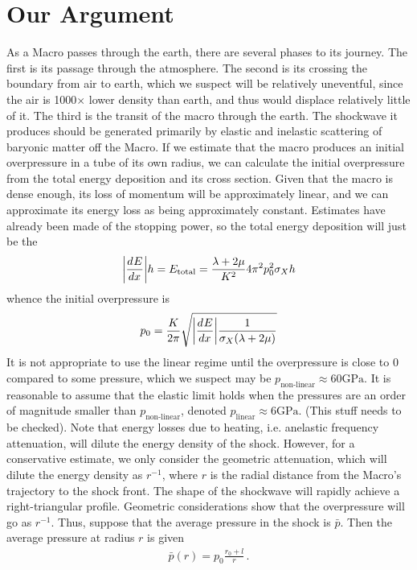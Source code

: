 \documentclass{article}
\newcommand*\te[1]{\text{#1}}
\newcommand*\f[2]{\frac{#1}{#2}}
\newcommand*\td[3]{\frac{d^{#3}#1}{d #2^{#3}}}
\begin{document}
\section{Our Argument}
As a Macro passes through the earth, there are several phases to its journey. The first is its passage through the atmosphere. The second is its crossing the boundary from air to earth, which we suspect will be relatively uneventful, since the air is 1000$\times$ lower density than earth, and thus would displace relatively little of it. The third is the transit of the macro through the earth. The shockwave it produces should be generated primarily by elastic and inelastic scattering of baryonic matter off the Macro. If we estimate that the macro produces an initial overpressure in a tube of its own radius, we can calculate the initial overpressure from the total energy deposition and its cross section. Given that the macro is dense enough, its loss of momentum will be approximately linear, and we can approximate its energy loss as being approximately constant. Estimates have already been made of the stopping power, so the total energy deposition will just be the
\begin{align}
\abs{\td{E}{x}{}}h=E_{\te{total}}=\f{\lambda+2\mu}{K^2}4\pi^2p_0^2\sigma_Xh
\end{align}
whence the initial overpressure is
\begin{align}
p_0=\f{K}{2\pi}\sqrt{\abs{\td{E}{x}{}}\f{1}{\sigma_X(\lambda+2\mu)}}
\end{align}
It is not appropriate to use the linear regime until the overpressure is close to 0 compared to some pressure, which we suspect may be $p_{\te{non-linear}}\approx60\te{GPa}$. It is reasonable to assume that the elastic limit holds when the pressures are an order of magnitude smaller than $p_{\te{non-linear}}$, denoted $p_{\te{linear}}\approx6\te{GPa}$. (This stuff needs to be checked). Note that energy losses due to heating, i.e. anelastic frequency attenuation, will dilute the energy density of the shock. However, for a conservative  estimate, we only consider the geometric attenuation, which will dilute the energy density as $r^{-1}$, where $r$ is the radial distance from the Macro's trajectory to the shock front. The shape of the shockwave will rapidly achieve a right-triangular profile. Geometric considerations show that the overpressure will go as $r^{-1}$. Thus, suppose that the average pressure in the shock is $\bar p$. Then the average pressure at radius $r$ is given
\begin{align}
\bar p(r)=p_0\f{r_0+l}{r}\,.
\end{align}
\end{document}
